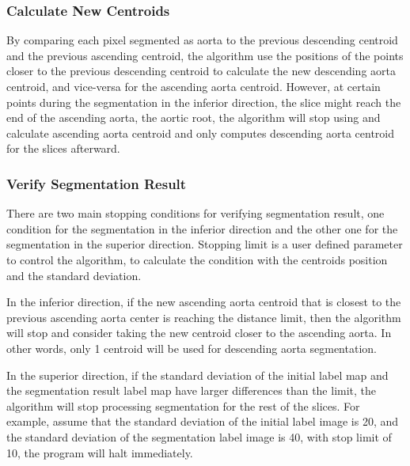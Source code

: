 \subsubsection{Calculate New Centroids}
By comparing each pixel segmented as aorta to the previous descending centroid and the previous ascending centroid, the algorithm use the positions of the points closer to the previous descending centroid to calculate the new descending aorta centroid, and vice-versa for the ascending aorta centroid. However, at certain points during the segmentation in the inferior direction, the slice might reach the end of the ascending aorta, the aortic root, the algorithm will stop using and calculate ascending aorta centroid and only computes descending aorta centroid for the slices afterward.

\subsubsection{Verify Segmentation Result}\label{stopping_condition}
There are two main stopping conditions for verifying segmentation result, one condition for the segmentation in the inferior direction and the other one for the segmentation in the superior direction. Stopping limit is a user defined parameter to control the algorithm, to calculate the condition with the centroids position and the standard deviation.

In the inferior direction, if the new ascending aorta centroid that is closest to the previous ascending aorta center is reaching the distance limit, then the algorithm will stop and consider taking the new centroid closer to the ascending aorta. In other words, only 1 centroid will be used for descending aorta segmentation.

In the superior direction, if the standard deviation of the initial label map and the segmentation result label map have larger differences than the limit, the algorithm will stop processing segmentation for the rest of the slices. For example, assume that the standard deviation of the initial label image is 20, and the standard deviation of the segmentation label image is 40, with stop limit of 10, the program will halt immediately.

